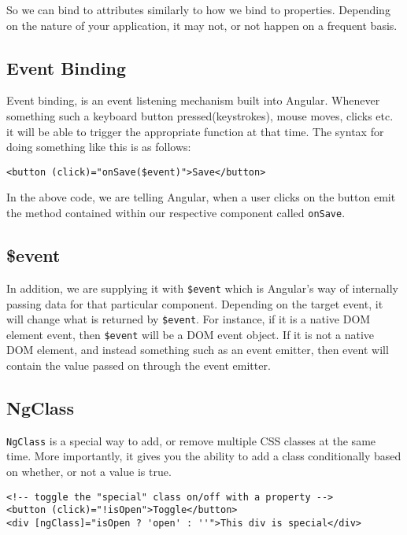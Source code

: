 So we can bind to attributes similarly to how we bind to properties. Depending
on the nature of your application, it may not, or not happen on a frequent 
basis.

\subsection{ Event Binding }
Event binding, is an event listening mechanism built into Angular. Whenever 
something such a keyboard button pressed(keystrokes), mouse moves, clicks etc. 
it will be able to trigger the appropriate function at that time. The syntax 
for doing something like this is as follows: 
\begin{lstlisting}
<button (click)="onSave($event)">Save</button> 
\end{lstlisting}

In the above code, we are telling Angular, when a user clicks on the button 
emit the method contained within our respective component called 
\lstinline{onSave}. 


\subsection{\$event}
In addition, we are supplying it with \lstinline{$event} which is Angular's way
of internally passing data for that particular component. Depending on the 
target event, it will change what is returned by \lstinline{$event}. For 
instance, if it is a native DOM element event, then \lstinline{$event} will be 
a DOM event object. If it is not a native DOM element, and instead something 
such as an event emitter, then event will contain the value passed on through 
the event emitter. 

\subsection{NgClass}
\lstinline{NgClass} is a special way to add, or remove multiple CSS classes 
at the same time. More importantly, it gives you the ability to add a class 
conditionally based on whether, or not a value is true. 
\begin{lstlisting}
<!-- toggle the "special" class on/off with a property -->
<button (click)="!isOpen">Toggle</button>
<div [ngClass]="isOpen ? 'open' : ''">This div is special</div>
\end{lstlisting}

